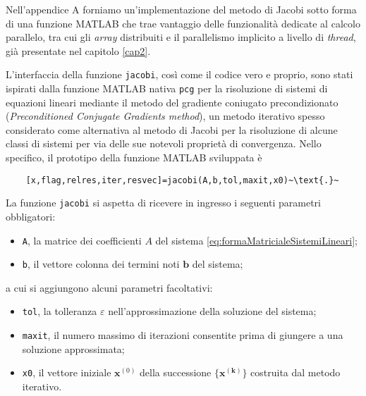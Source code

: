 Nell'appendice A forniamo un'implementazione del metodo di Jacobi sotto forma di una funzione MATLAB che trae vantaggio delle funzionalit\`a dedicate al 
calcolo parallelo, tra cui gli \textit{array} distribuiti e il parallelismo implicito a livello di \textit{thread}, gi\`a presentate nel capitolo 
\ref{cap2}.

L'interfaccia della funzione \lstinline|jacobi|, cos\`i come il codice vero e proprio, sono stati ispirati dalla funzione MATLAB nativa 
\lstinline|pcg| per la risoluzione di sistemi di equazioni lineari mediante il metodo del gradiente coniugato precondizionato \, \cite{MathWorksPCG} 
(\textit{Preconditioned Conjugate Gradients method}), un metodo iterativo spesso considerato come alternativa al metodo di Jacobi per la risoluzione 
di alcune classi di sistemi per via delle sue notevoli propriet\`a di convergenza.\newline
Nello specifico, il prototipo della funzione MATLAB sviluppata \`e
\begin{lstlisting}
    [x,flag,relres,iter,resvec]=jacobi(A,b,tol,maxit,x0)~\text{.}~
\end{lstlisting}

La funzione \lstinline|jacobi| si aspetta di ricevere in ingresso i seguenti parametri obbligatori:
\begin{itemize}
    \item \lstinline|A|, la matrice dei coefficienti $A$ del sistema \eqref{eq:formaMatricialeSistemiLineari};
    \item \lstinline|b|, il vettore colonna dei termini noti $\mathbf{b}$ del sistema;
\end{itemize}
a cui si aggiungono alcuni parametri facoltativi:
\begin{itemize}
    \item \lstinline|tol|, la tolleranza $\varepsilon$ nell'approssimazione della soluzione del sistema;
    \item \lstinline|maxit|, il numero massimo di iterazioni consentite prima di giungere a una soluzione approssimata;
    \item \lstinline|x0|, il vettore iniziale $\mathbf{x}^{(0)}$ della successione $\mathbf{\{x^{(k)}\}}$ costruita dal metodo iterativo.
\end{itemize}

